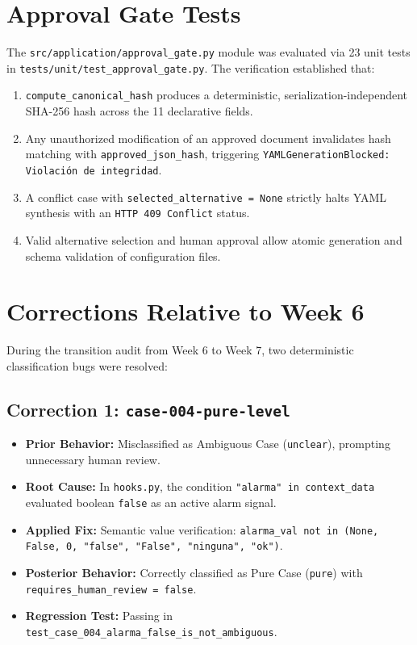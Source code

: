 \documentclass[11pt,a4paper]{article}
\begin{document}
\section{Approval Gate Tests}
The \texttt{src/application/approval\_gate.py} module was evaluated via 23 unit tests in \texttt{tests/unit/test\_approval\_gate.py}. The verification established that:
\begin{enumerate}
    \item \texttt{compute\_canonical\_hash} produces a deterministic, serialization-independent SHA-256 hash across the 11 declarative fields.
    \item Any unauthorized modification of an approved document invalidates hash matching with \texttt{approved\_json\_hash}, triggering \texttt{YAMLGenerationBlocked: Violación de integridad}.
    \item A conflict case with \texttt{selected\_alternative = None} strictly halts YAML synthesis with an \texttt{HTTP 409 Conflict} status.
    \item Valid alternative selection and human approval allow atomic generation and schema validation of configuration files.
\end{enumerate}

\section{Corrections Relative to Week 6}
During the transition audit from Week 6 to Week 7, two deterministic classification bugs were resolved:

\subsection{Correction 1: \texttt{case-004-pure-level}}
\begin{itemize}[leftmargin=*]
    \item \textbf{Prior Behavior:} Misclassified as Ambiguous Case (\texttt{unclear}), prompting unnecessary human review.
    \item \textbf{Root Cause:} In \texttt{hooks.py}, the condition \texttt{"alarma" in context\_data} evaluated boolean \texttt{false} as an active alarm signal.
    \item \textbf{Applied Fix:} Semantic value verification: \texttt{alarma\_val not in (None, False, 0, "false", "False", "ninguna", "ok")}.
    \item \textbf{Posterior Behavior:} Correctly classified as Pure Case (\texttt{pure}) with \texttt{requires\_human\_review = false}.
    \item \textbf{Regression Test:} Passing in \texttt{test\_case\_004\_alarma\_false\_is\_not\_ambiguous}.
\end{itemize}
\end{document}
